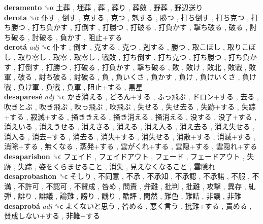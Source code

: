 \textbf{deramento} ␝α   土葬 ,  埋葬 ,  葬 ,  葬り ,  葬斂 ,  野葬 ,  野辺送り   \\
\textbf{derota} ␝α   仆す ,  倒す ,  克する ,  克つ ,  剋する ,  勝つ ,  打ち倒す ,  打ち克つ ,  打ち勝つ ,  打ち負かす ,  打倒す ,  打勝つ ,  打破る ,  打負かす ,  撃ち破る ,  破る ,  討ち破る ,  討破る ,  負かす ,  阻止+する   \\
\textbf{derotá} \emph{adj}  ␝ϲ   仆す ,  倒す ,  克する ,  克つ ,  剋する ,  勝つ ,  取こぼし ,  取りこぼし ,  取り零し ,  取零 ,  取零し ,  戦敗 ,  打ち倒す ,  打ち克つ ,  打ち勝つ ,  打ち負かす ,  打倒す ,  打勝つ ,  打破る ,  打負かす ,  撃ち破る ,  敗 ,  敗け ,  敗北 ,  敗戦 ,  敗軍 ,  破る ,  討ち破る ,  討破る ,  負 ,  負いくさ ,  負かす ,  負け ,  負けいくさ ,  負け戦 ,  負け軍 ,  負戦 ,  負軍 ,  阻止+する ,  黒星   \\
\textbf{desaparesé} \emph{adj}  ␝ϲ   かき消える ,  どろん+する ,  ふっ飛ぶ ,  ドロン+する ,  去る ,  吹きとぶ ,  吹き飛ぶ ,  吹っ飛ぶ ,  吹飛ぶ ,  失せる ,  失せ去る ,  失跡+する ,  失踪+する ,  寂滅+する ,  掻ききえる ,  掻き消える ,  掻消える ,  没する ,  没了+する ,  消えいる ,  消えうせる ,  消えさる ,  消える ,  消え入る ,  消え去る ,  消え失せる ,  消入る ,  消去+する ,  消去る ,  消失+する ,  消失せる ,  消散+する ,  消滅+する ,  消除+する ,  無くなる ,  蒸発+する ,  雲がくれ+する ,  雲隠+する ,  雲隠れ+する   \\
\textbf{desaparishon} ␝ϲ   フェイド ,  フェイドアウト ,  フェード ,  フェードアウト ,  失跡 ,  失踪 ,  姿をくらませること ,  消失 ,  見えなくなること ,  雲隠れ   \\
\textbf{desaprobashon} ␝ϲ   そしり ,  不同意 ,  不承 ,  不承知 ,  不承認 ,  不承諾 ,  不服 ,  不満 ,  不許可 ,  不認可 ,  不賛成 ,  咎め ,  問責 ,  弁難 ,  批判 ,  批難 ,  攻撃 ,  異存 ,  糺弾 ,  誹り ,  誹議 ,  論難 ,  謗り ,  譏り ,  酷評 ,  間然 ,  難色 ,  難詰 ,  非議 ,  非難   \\
\textbf{desaprobá} \emph{adj}  ␝ϲ   よくないと思う ,  咎める ,  悪く言う ,  批難+する ,  責める ,  賛成しない+する ,  非難+する   \\
